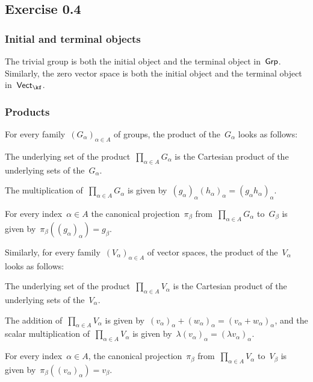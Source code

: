 \subsection{Exercise 0.4}



\subsubsection{Initial and terminal objects}

The trivial group is both the initial object and the terminal object in~$\mathsf{Grp}$.
Similarly, the zero vector space is both the initial object and the terminal object in~$\Vectk$.



\subsubsection{Products}

For every family~$(G_α)_{α ∈ A}$ of groups, the product of the~$G_α$ looks as follows:
\begin{itemize*}

	\item
		The underlying set of the product~$\prod_{α ∈ A} G_α$ is the Cartesian product of the underlying sets of the~$G_α$.

	\item
		The multiplication of~$∏_{α ∈ A} G_α$ is given by~$(g_α)_α (h_α)_α = (g_α h_α)_α$.

	\item
		For every index~$α ∈ A$ the canonical projection~$π_β$ from~$∏_{α ∈ A} G_α$ to~$G_β$ is given by~$π_β( (g_α)_α ) = g_β$.

\end{itemize*}
Similarly, for every family~$(V_α)_{α ∈ A}$ of vector spaces, the product of the~$V_α$ looks as follows:
\begin{itemize*}

	\item
		The underlying set of the product~$\prod_{α ∈ A} V_α$ is the Cartesian product of the underlying sets of the~$V_α$.

	\item
		The addition of~$∏_{α ∈ A} V_α$ is given by~$(v_α)_α + (w_α)_α =(v_α + w_α)_α$, and the scalar multiplication of~$∏_{α ∈ A} V_α$ is given by~$λ (v_α)_α = (λ v_α)_α$.

	\item
		For every index~$α ∈ A$, the canonical projection~$π_β$ from~$∏_{α ∈ A} V_α$ to~$V_β$ is given by~$π_β( (v_α)_α ) = v_β$.

\end{itemize*}



